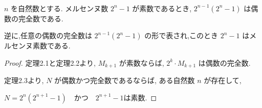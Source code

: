 \begin{theorem}\label{even_and_perfect_iff}
\leanok{}~\

\( n \) を自然数とする.
メルセンヌ数 \( 2^n - 1 \) が素数であるとき, \( 2^{n-1}(2^n - 1) \) は偶数の完全数である.

逆に,任意の偶数の完全数は \( 2^{n-1}(2^n - 1) \) の形で表され,このとき \( 2^n - 1 \) はメルセンヌ素数である.

\end{theorem}

\begin{proof}
定理2.1と定理2.2より, \(M_{k+1}\) が素数ならば, \(2^k \cdot M_{k+1}\) は偶数の完全数.

定理2.3より, \(N\) が偶数かつ完全数であるならば, ある自然数 \(n\) が存在して,

\(N = 2^n(2^{n+1} - 1) \quad \text{かつ} \quad 2^{n+1} - 1 \text{は素数}\).
\end{proof}

